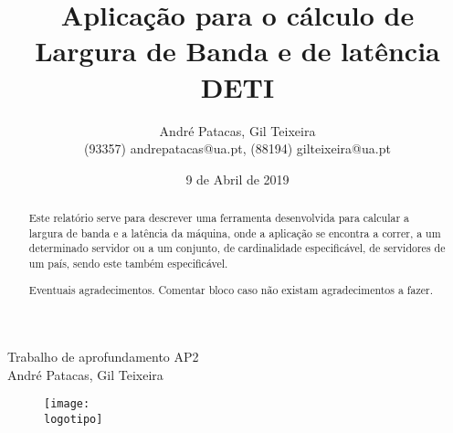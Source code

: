 \documentclass{report}
\begin{document}
%
\def\titulo{Trabalho de aprofundamento AP2}
\def\data{9 de Abril de 2019}
\def\autores{André Patacas, Gil Teixeira}
\def\autorescontactos{(93357) andrepatacas@ua.pt, (88194) gilteixeira@ua.pt}
\def\departamento{DETI}
\def\logotipo{ua.pdf}
%
%
\begin{titlepage}

\begin{center}
%
\vspace*{50mm}
%
{\Huge \titulo}\\ 
%
%
\vspace{10mm}
%
{\LARGE \autores}\\ 
%
\vspace{30mm}
%
\begin{figure}[h]
\center
\texttt{[image: \\logotipo]}
\end{figure}
%
\vspace{30mm}
\end{center}
%
\begin{flushright}
\end{flushright}
\end{titlepage}

\title{%
{\Huge\textbf{Aplicação para o cálculo de Largura de Banda e de latência}}\\
{\Large \departamento}
}
%
\author{%
    \autores \\
    \autorescontactos
}
%
\date{\data}
%
\maketitle


\begin{abstract}
Este relatório serve para descrever uma ferramenta desenvolvida para calcular a largura de banda e a latência da máquina, onde a aplicação se encontra a correr, a um determinado servidor ou a um conjunto, de cardinalidade especificável, de servidores de um país, sendo este também especificável.

\end{abstract}

\renewcommand{\abstractname}{Agradecimentos}
\begin{abstract}
Eventuais agradecimentos.
Comentar bloco caso não existam agradecimentos a fazer.
\end{abstract}
\end{document}
